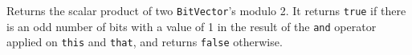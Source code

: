 \begin{tabb} Returns the scalar product of two \texttt{BitVector}'s modulo 2.
  It returns \texttt{true} if there is an odd number of bits with a value of 1 
  in the result of the \texttt{and} operator applied on \texttt{this} and
  \texttt{that}, and returns \texttt{false} otherwise.
\end{tabb}
\begin{htmlonly}
\end{htmlonly}

\begin{code}
\begin{hide}
}
\end{hide}
\end{code}
